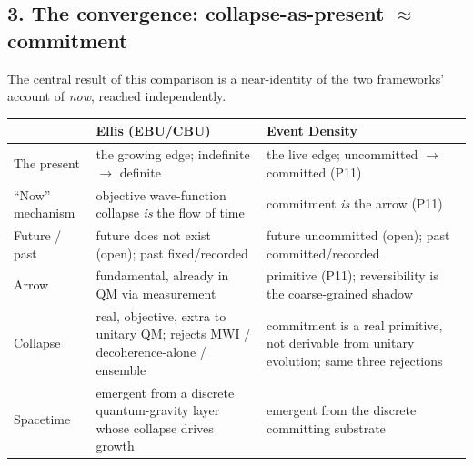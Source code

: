 \documentclass[
  11pt,
]{article}
\newcounter{none} %
\begin{document}
\subsection{\texorpdfstring{3. The convergence: collapse-as-present
\(\approx\)
commitment}{3. The convergence: collapse-as-present  commitment}}\label{the-convergence-collapse-as-present-commitment}

The central result of this comparison is a near-identity of the two
frameworks' account of \emph{now}, reached independently.

{\def\LTcaptype{none} %
\begin{longtable}[]{@{}
  >{\raggedright\arraybackslash}p{}
  >{\raggedright\arraybackslash}p{}
  >{\raggedright\arraybackslash}p{}@{}}
\toprule\noalign{}
\begin{minipage}[b]{\linewidth}\raggedright
\end{minipage} & \begin{minipage}[b]{\linewidth}\raggedright
Ellis (EBU/CBU)
\end{minipage} & \begin{minipage}[b]{\linewidth}\raggedright
Event Density
\end{minipage} \\
\midrule\noalign{}
\endhead
\bottomrule\noalign{}
\endlastfoot
The present & the growing edge; indefinite \(\to\) definite & the live
edge; uncommitted \(\to\) committed (P11) \\
``Now'' mechanism & objective wave-function collapse \emph{is} the flow
of time & commitment \emph{is} the arrow (P11) \\
Future / past & future does not exist (open); past fixed/recorded &
future uncommitted (open); past committed/recorded \\
Arrow & fundamental, already in QM via measurement & primitive (P11);
reversibility is the coarse-grained shadow \\
Collapse & real, objective, extra to unitary QM; rejects MWI /
decoherence-alone / ensemble & commitment is a real primitive, not
derivable from unitary evolution; same three rejections \\
Spacetime & emergent from a discrete quantum-gravity layer whose
collapse drives growth & emergent from the discrete committing
substrate \\
\end{longtable}
}
\end{document}
